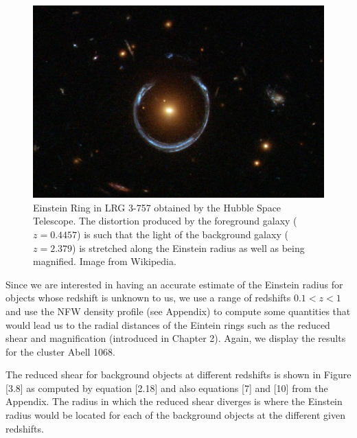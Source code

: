 \begin{figure}[H]
\centering
\includegraphics[width=12cm]{images/einstein_ring_wiki.jpg}
\caption[Einstein Ring in LRG 3-757]{Einstein Ring in LRG 3-757 obtained by the Hubble Space Telescope. The distortion produced by the foreground galaxy ($z=0.4457$) is such that the light of the background galaxy ($z=2.379$) is stretched along the Einstein radius as well as being magnified. Image from Wikipedia.}
\end{figure}

Since we are interested in having an accurate estimate of the Einstein radius for objects whose redshift is unknown to us, we use a range of redshifts  $0.1<z<1$ and use the NFW density profile (see Appendix) to compute some quantities that would lead us to the radial distances of the Eintein rings such as the reduced shear and magnification (introduced in Chapter 2). Again, we display the results for the cluster Abell 1068.

The reduced shear for background objects at different redshifts is shown in Figure [3.8] as computed by equation [2.18] and also equations [7] and [10] from the Appendix. The radius in which the reduced shear diverges is where the Einstein radius would be located for each of the background objects at the different given redshifts. 

